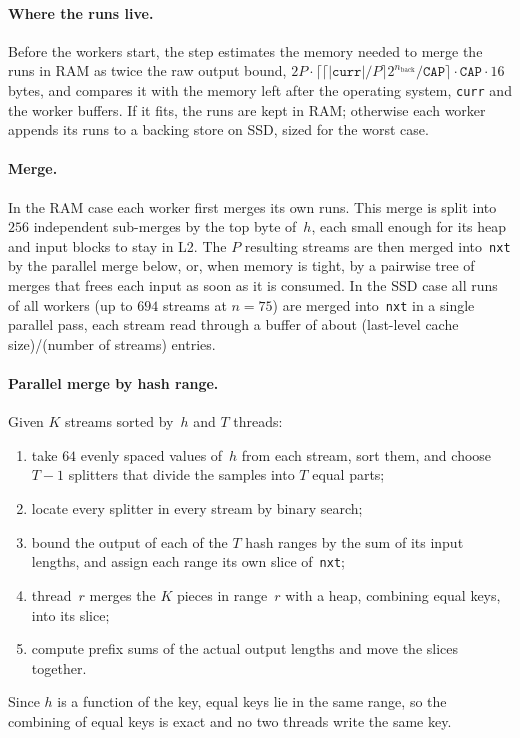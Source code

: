 \documentclass[12pt]{article}
\theoremstyle{definition}
\newcommand{\nb}{n_{\mathrm{back}}}
\newcommand{\nxt}{\texttt{nxt}}
\newcommand{\curr}{\texttt{curr}}
\begin{document}
\paragraph{Where the runs live.}
Before the workers start, the step estimates the memory needed to merge the
runs in RAM as twice the raw output bound,
$2P\cdot\lceil \lceil|\curr|/P\rceil 2^{\nb}/\texttt{CAP}\rceil\cdot\texttt{CAP}
\cdot 16$ bytes, and compares it with the memory left after the operating
system, \curr{} and the worker buffers.
If it fits, the runs are kept in RAM; otherwise each worker appends its runs
to a backing store on SSD, sized for the worst case.

\paragraph{Merge.}
In the RAM case each worker first merges its own runs.
This merge is split into $256$ independent sub-merges by the top byte
of~$h$, each small enough for its heap and input blocks to stay in L2.
The $P$ resulting streams are then merged into~\nxt{} by the parallel merge
below, or, when memory is tight, by a pairwise tree of merges that frees
each input as soon as it is consumed.
In the SSD case all runs of all workers (up to $694$ streams at $n=75$) are
merged into~\nxt{} in a single parallel pass, each stream read through a
buffer of about (last-level cache size)/(number of streams) entries.

\paragraph{Parallel merge by hash range.}
Given $K$ streams sorted by~$h$ and $T$ threads:
\begin{enumerate}[nosep]
  \item take $64$ evenly spaced values of~$h$ from each stream, sort them, and
        choose $T-1$ splitters that divide the samples into $T$ equal parts;
  \item locate every splitter in every stream by binary search;
  \item bound the output of each of the $T$ hash ranges by the sum of its input
        lengths, and assign each range its own slice of~\nxt;
  \item thread~$r$ merges the $K$ pieces in range~$r$ with a heap,
        combining equal keys, into its slice;
  \item compute prefix sums of the actual output lengths and move the slices
        together.
\end{enumerate}
Since $h$ is a function of the key, equal keys lie in the same range, so the
combining of equal keys is exact and no two threads write the same key.
\end{document}
